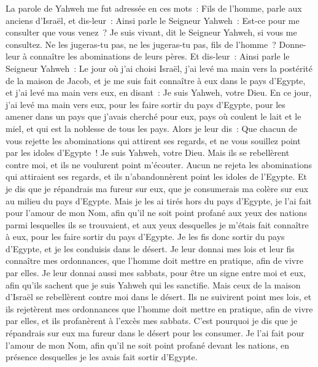 \begin{multicols}{2}
La parole de Yahweh me fut adressée en ces mots~:
Fils de l'homme, parle aux anciens d'Israël, et dis-leur~: Ainsi parle le Seigneur Yahweh~: Est-ce pour me consulter que vous venez~? Je suis vivant, dit le Seigneur Yahweh, si vous me consultez.
Ne les jugeras-tu pas, ne les jugeras-tu pas, fils de l'homme~? Donne-leur à connaître les abominations de leurs pères.
Et dis-leur~: Ainsi parle le Seigneur Yahweh~: Le jour où j'ai choisi Israël, j'ai levé ma main vers la postérité de la maison de Jacob, et je me suis fait connaître à eux dans le pays d'Egypte, et j'ai levé ma main vers eux, en disant~: Je suis Yahweh, votre Dieu.
En ce jour, j'ai levé ma main vers eux, pour les faire sortir du pays d'Egypte, pour les amener dans un pays que j'avais cherché pour eux, pays où coulent le lait et le miel, et qui est la noblesse de tous les pays.
Alors je leur dis~: Que chacun de vous rejette les abominations qui attirent ses regards, et ne vous souillez point par les idoles d'Egypte~! Je suis Yahweh, votre Dieu.
Mais ils se rebellèrent contre moi, et ils ne voulurent point m'écouter. Aucun ne rejeta les abominations qui attiraient ses regards, et ils n'abandonnèrent point les idoles de l'Egypte. Et je dis que je répandrais ma fureur sur eux, que je consumerais ma colère sur eux au milieu du pays d'Egypte.
Mais je les ai tirés hors du pays d'Egypte, je l'ai fait pour l'amour de mon Nom, afin qu'il ne soit point profané aux yeux des nations parmi lesquelles ils se trouvaient, et aux yeux desquelles je m'étais fait connaître à eux, pour les faire sortir du pays d'Egypte.
Je les fis donc sortir du pays d'Egypte, et je les conduisis dans le désert.
Je leur donnai mes lois et leur fis connaître mes ordonnances, que l'homme doit mettre en pratique, afin de vivre par elles.
Je leur donnai aussi mes sabbats, pour être un signe entre moi et eux, afin qu'ils sachent que je suis Yahweh qui les sanctifie.
Mais ceux de la maison d'Israël se rebellèrent contre moi dans le désert. Ils ne suivirent point mes lois, et ils rejetèrent mes ordonnances que l'homme doit mettre en pratique, afin de vivre par elles, et ils profanèrent à l'excès mes sabbats. C'est pourquoi je dis que je répandrais sur eux ma fureur dans le désert pour les consumer.
Je l'ai fait pour l'amour de mon Nom, afin qu'il ne soit point profané devant les nations, en présence desquelles je les avais fait sortir d'Egypte.

\end{multicols}
